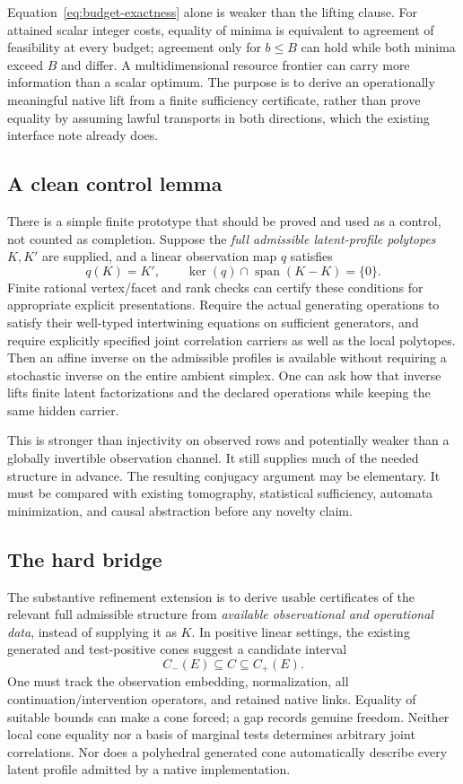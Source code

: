 \documentclass[11pt]{article}
\theoremstyle{remark}
\newcommand{\spanlin}{\operatorname{span}}
\begin{document}
Equation~\eqref{eq:budget-exactness} alone is weaker than the lifting clause. For attained scalar integer costs, equality of minima is equivalent to agreement of feasibility at every budget; agreement only for $b\leq B$ can hold while both minima exceed $B$ and differ. A multidimensional resource frontier can carry more information than a scalar optimum. The purpose is to derive an operationally meaningful native lift from a finite sufficiency certificate, rather than prove equality by assuming lawful transports in both directions, which the existing interface note already does.

\subsection{A clean control lemma}

There is a simple finite prototype that should be proved and used as a control, not counted as completion. Suppose the \emph{full admissible latent-profile polytopes} $K,K'$ are supplied, and a linear observation map $q$ satisfies
\begin{equation}
 q(K)=K',\qquad
 \ker(q)\cap\spanlin(K-K)=\{0\}.
 \label{eq:polytope-iso}
\end{equation}
Finite rational vertex/facet and rank checks can certify these conditions for appropriate explicit presentations. Require the actual generating operations to satisfy their well-typed intertwining equations on sufficient generators, and require explicitly specified joint correlation carriers as well as the local polytopes. Then an affine inverse on the admissible profiles is available without requiring a stochastic inverse on the entire ambient simplex. One can ask how that inverse lifts finite latent factorizations and the declared operations while keeping the same hidden carrier.

This is stronger than injectivity on observed rows and potentially weaker than a globally invertible observation channel. It still supplies much of the needed structure in advance. The resulting conjugacy argument may be elementary. It must be compared with existing tomography, statistical sufficiency, automata minimization, and causal abstraction before any novelty claim.

\subsection{The hard bridge}

The substantive refinement extension is to derive usable certificates of the relevant full admissible structure from \emph{available observational and operational data}, instead of supplying it as $K$. In positive linear settings, the existing generated and test-positive cones suggest a candidate interval
\[
 C_-(E)\subseteq C\subseteq C_+(E).
\]
One must track the observation embedding, normalization, all continuation/intervention operators, and retained native links. Equality of suitable bounds can make a cone forced; a gap records genuine freedom. Neither local cone equality nor a basis of marginal tests determines arbitrary joint correlations. Nor does a polyhedral generated cone automatically describe every latent profile admitted by a native implementation.
\end{document}
